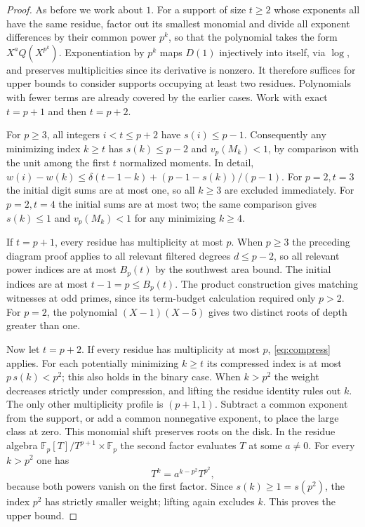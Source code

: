 \documentclass[11pt]{article}
\newcommand{\F}{\mathbb F}
\newcommand{\ord}{v_p}
\begin{document}
\begin{proof}
As before we work about $1$. For a support of size $t\ge2$ whose exponents all have the same residue, factor out its smallest monomial and divide all exponent differences by their common power $p^k$, so that the polynomial takes the form $X^a Q(X^{p^k})$. Exponentiation by $p^k$ maps $D(1)$ injectively into itself, via $\log$, and preserves multiplicities since its derivative is nonzero. It therefore suffices for upper bounds to consider supports occupying at least two residues. Polynomials with fewer terms are already covered by the earlier cases. Work with exact $t=p+1$ and then $t=p+2$.

For $p\ge3$, all integers $i<t\le p+2$ have $s(i)\le p-1$. Consequently any minimizing index $k\ge t$ has $s(k)\le p-2$ and $\ord(M_k)<1$, by comparison with the unit among the first $t$ normalized moments. In detail, $w(i)-w(k)\le\delta(t-1-k)+(p-1-s(k))/(p-1)$. For $p=2,t=3$ the initial digit sums are at most one, so all $k\ge3$ are excluded immediately. For $p=2,t=4$ the initial sums are at most two; the same comparison gives $s(k)\le1$ and $\ord(M_k)<1$ for any minimizing $k\ge4$.

If $t=p+1$, every residue has multiplicity at most $p$. When $p\ge3$ the preceding diagram proof applies to all relevant filtered degrees $d\le p-2$, so all relevant power indices are at most $B_p(t)$ by the southwest area bound. The initial indices are at most $t-1=p\le B_p(t)$. The product construction gives matching witnesses at odd primes, since its term-budget calculation required only $p>2$. For $p=2$, the polynomial $(X-1)(X-5)$ gives two distinct roots of depth greater than one.

Now let $t=p+2$. If every residue has multiplicity at most $p$, \eqref{eq:compress} applies. For each potentially minimizing $k\ge t$ its compressed index is at most $p\,s(k)<p^2$; this also holds in the binary case. When $k>p^2$ the weight decreases strictly under compression, and lifting the residue identity rules out $k$. The only other multiplicity profile is $(p+1,1)$. Subtract a common exponent from the support, or add a common nonnegative exponent, to place the large class at zero. This monomial shift preserves roots on the disk. In the residue algebra $\F_p[T]/T^{p+1}\times\F_p$ the second factor evaluates $T$ at some $a\ne0$. For every $k>p^2$ one has
\[
 T^k=a^{k-p^2}T^{p^2},
\]
because both powers vanish on the first factor. Since $s(k)\ge1=s(p^2)$, the index $p^2$ has strictly smaller weight; lifting again excludes $k$. This proves the upper bound.


\end{proof}
\end{document}
